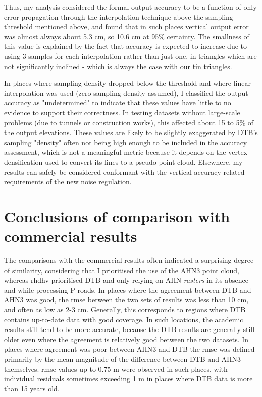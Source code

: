 Thus, my analysis considered the formal output accuracy to be a function of only error propagation through the interpolation technique above the sampling threshold mentioned above, and found that in such places vertical output error was almost always about 5.3 cm, so 10.6 cm at 95\% certainty. The smallness of this value is explained by the fact that accuracy is expected to increase due to using 3 samples for each interpolation rather than just one, in triangles which are not significantly inclined - which is always the case with our \ac{tin} triangles.

In places where sampling density dropped below the threshold and where linear interpolation was used (zero sampling density assumed), I classified the output accuracy as "undetermined" to indicate that these values have little to no evidence to support their correctness. In testing datasets without large-scale problems (due to tunnels or construction works), this affected about 15 to 5\% of the output elevations. These values are likely to be slightly exaggerated by DTB's sampling "density" often not being high enough to be included in the accuracy assessment, which is not a meaningful metric because it depends on the vertex densification used to convert its lines to a pseudo-point-cloud. Elsewhere, my results can safely be considered conformant with the vertical accuracy-related requirements of the new noise regulation.

\section{Conclusions of comparison with commercial results}
\label{sec:conclusionscomparison}

The comparisons with the commercial results often indicated a surprising degree of similarity, considering that I prioritised the use of the AHN3 point cloud, whereas \ac{rhdhv} prioritised DTB and only relying on AHN \textit{rasters} in its absence and while processing P-roads. In places where the agreement between DTB and AHN3 was good, the \ac{rmse} between the two sets of results was less than 10 cm, and often as low as 2-3 cm. Generally, this corresponds to regions where DTB contains up-to-date data with good coverage. In such locations, the academic results still tend to be more accurate, because the DTB results are generally still older even where the agreement is relatively good between the two datasets. In places where agreement was poor between AHN3 and DTB the \ac{rmse} was defined primarily by the mean magnitude of the difference between DTB and AHN3 themselves. \ac{rmse} values up to 0.75 m were observed in such places, with individual residuals sometimes exceeding 1 m in places where DTB data is more than 15 years old.

